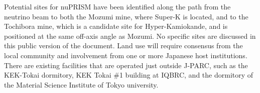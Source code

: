 %
%

Potential sites for nuPRISM have been identified along the path from the neutrino beam to both the Mozumi mine, where Super-K is located, and to the Tochibora mine, which is a candidate site for Hyper-Kamiokande, and is positioned at the same off-axis angle as Mozumi. No specific sites are discussed in this public version of the document.
Land use will require consensus from the local community and involvement from one or more Japanese host institutions. There are existing facilities that are operated just outside J-PARC, such as the KEK-Tokai dormitory, KEK Tokai \#1 building at IQBRC, and  the dormitory of the Material Science Institute of Tokyo university.

